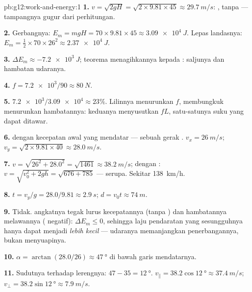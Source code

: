 \begin{solution}{pb:g12:work-and-energy:1}
\textbf{1.} $v = \sqrt{2gH} = \sqrt{2 \times 9.81 \times 45} \approx
\qty{29.7}{m/s}$:  ,  tanpa  ---
tampangnya gugur dari perhitungan.

\textbf{2.} Gerbangnya: $E_m = mgH = 70 \times 9.81 \times 45 \approx
\qty{3.09e4}{J}$. Lepas landasnya: $E_m = \tfrac12 \times 70 \times 26^2
\approx \qty{2.37e4}{J}$.

\textbf{3.} $\Delta E_m \approx \qty{-7.2e3}{J}$; teorema  menagihkannya kepada :
 saljunya dan hambatan udaranya.

\textbf{4.} $f = \num{7.2e3}/90 \approx \qty{80}{N}$.

\textbf{5.} $\num{7.2e3}/\num{3.09e4} \approx 23\%$. Lilinnya menurunkan $f$,
membungkuk menurunkan hambatannya: keduanya menyusutkan $fL$, satu-satunya suku yang dapat ditawar.

\textbf{6.}  dengan kecepatan awal yang mendatar --- sebuah
gerak . $v_x = \qty{26}{m/s}$;
$v_y = \sqrt{2 \times 9.81 \times 40} \approx \qty{28.0}{m/s}$.

\textbf{7.} $v = \sqrt{26^2 + 28.0^2} = \sqrt{1461} \approx
\qty{38.2}{m/s}$; dengan : $v = \sqrt{v_0^2 + 2gh} = \sqrt{676 + 785}$
--- serupa. Sekitar \qty{138}{km/h}.

\textbf{8.} $t = v_y/g = 28.0/9.81 \approx \qty{2.9}{s}$;
$d = v_0 t \approx \qty{74}{m}$.

\textbf{9.} Tidak.  angkatnya tegak lurus kecepatannya (tanpa ) dan
hambatannya melawannya ( negatif): $\Delta E_m \leq 0$, sehingga laju
pendaratan yang sesungguhnya hanya dapat menjadi \emph{lebih kecil} --- udaranya
memanjangkan penerbangannya, bukan menyuapinya.

\textbf{10.} $\alpha = \arctan(28.0/26) \approx \qty{47}{\degree}$
di bawah garis mendatarnya.

\textbf{11.} Sudutnya terhadap lerengnya: $47 - 35 = \qty{12}{\degree}$.
$v_\parallel = 38.2\cos\qty{12}{\degree} \approx \qty{37.4}{m/s}$;
$v_\perp = 38.2\sin\qty{12}{\degree} \approx \qty{7.9}{m/s}$.


\end{solution}
